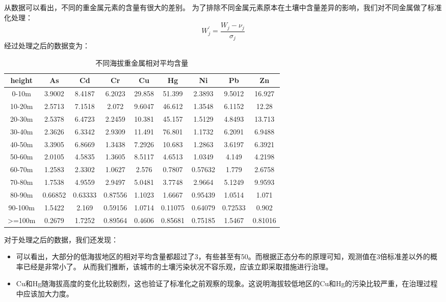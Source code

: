 \documentclass[a4paper]{article}
\begin{document}
从数据可以看出，不同的重金属元素的含量有很大的差别。
为了排除不同金属元素原本在土壤中含量差异的影响，我们对不同金属做了标准化处理：
\begin{equation}
W_j^{\prime} = \frac{W_j - \nu_j}{\sigma_j}
\end{equation}
经过处理之后的数据变为：
\begin{table}[H]
		\centering
		\caption{不同海拔重金属相对平均含量}
		\label{average-contend}
		\begin{tabular}{c|cccccccc}
		\hline
			height	  &          	As	&   Cd   &     Cr     &   Cu   &     Hg  &    Ni   &     Pb    &   Zn  \\
			\hline
			 0-10m     	&	 3.9002  &   8.4187   &  6.2023  &  29.858  &   51.399  &   2.3893  &   9.5012  &   16.927    \\
    			10-20m     	&	 2.5713  &   7.1518   &   2.072  &  9.6047  &   46.612  &   1.3548  &   6.1152  &    12.28    \\
   			20-30m    	&	 2.5378  &   6.4723   &  2.2459  &  10.381  &   45.157  &   1.5129  &   4.8493  &   13.713    \\
    			30-40m     	&	 2.3626  &   6.3342   &  2.9309  &  11.491  &   76.801  &   1.1732  &   6.2091  &   6.9488    \\
    			40-50m     	&	 3.3905  &   6.8669   &  1.3438  &  7.2926  &   10.683  &   1.2863  &   3.6197  &   6.3921    \\
    			50-60m      	&	 2.0105  &   4.5835   &  1.3605  &  8.5117  &   4.6513  &   1.0349  &    4.149  &   4.2198    \\
    			60-70m     	&	 1.2583  &   2.3302   &  1.0627  &   2.576  &   0.7807  &  0.57632  &    1.779  &   2.6758    \\
    			70-80m     	&	 1.7538  &   4.9559   &  2.9497  &  5.0481  &   3.7748  &   2.9664  &   5.1249  &   9.9593    \\
    			80-90m     	&	 0.66852 &   0.63333  &  0.87556 &   1.1023 &    1.6667 &   0.95439 &    1.0514 &     1.071   \\
    			90-100m    	&	 1.5422  &    2.169   & 0.59156  &  1.0714  &  0.11075  &  0.64079  &  0.72533  &    0.902    \\
    			>=100m    	&	 0.2679  &   1.7252   & 0.89564  &  0.4606  &  0.85681  &  0.75185  &   1.5467  &  0.81016    \\
    			\hline
		\end{tabular}
	\end{table}
对于处理之后的数据，我们还发现：
\begin{itemize}
\item 可以看出，大部分的低海拔地区的相对平均含量都超过了3，有些甚至有50。而根据正态分布的原理可知，观测值在3倍标准差以外的概率已经是非常小了。
从而我们推断，该城市的土壤污染状况不容乐观，应该立即采取措施进行治理。
\item Cu和Hg随海拔高度的变化比较剧烈，这也验证了标准化之前观察的现象。这说明海拔较低地区的Cu和Hg的污染比较严重，在治理过程中应该加大力度。
\end{itemize}
\end{document}
